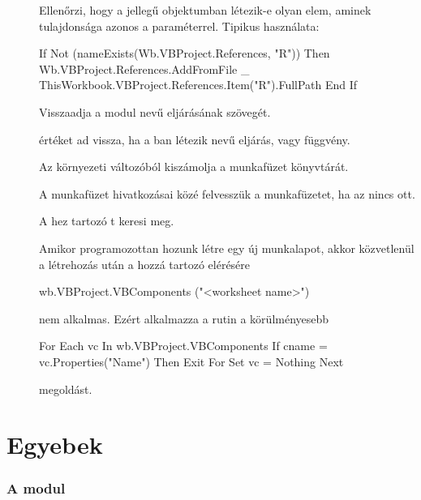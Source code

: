 \begin{description}
\item[] Ellenőrzi,
  hogy a 
   jellegű objektumban létezik-e
  olyan elem, aminek  tulajdonsága azonos a 
  paraméterrel. Tipikus használata: 
\begin{VBAframe}
If Not (nameExists(Wb.VBProject.References, "R")) Then
  Wb.VBProject.References.AddFromFile _
    ThisWorkbook.VBProject.References.Item("R").FullPath
End If
\end{VBAframe}
\item[]
  Visszaadja a  modul  nevű eljárásának szövegét.
\item[]
   értéket ad vissza, ha a 
  ban létezik  nevű eljárás, vagy függvény. 
\item[] Az  környezeti változóból kiszámolja
  a  munkafüzet könyvtárát. 
\item[] A  munkafüzet
  hivatkozásai közé felvesszük a  
  munkafüzetet, ha az nincs ott.
\item[] A 
  hez tartozó t keresi meg.

Amikor programozottan hozunk létre egy új munkalapot, akkor
közvetlenül a létrehozás után a hozzá tartozó  elérésére 
\begin{VBAframe}
wb.VBProject.VBComponents ("<worksheet name>")
\end{VBAframe}
nem alkalmas. Ezért alkalmazza a rutin a körülményesebb
\begin{VBAframe}
For Each vc In wb.VBProject.VBComponents
  If cname = vc.Properties("Name") Then Exit For
    Set vc = Nothing
Next
\end{VBAframe}
megoldást.
\end{description}

\section{Egyebek}\label{sec:6.6}

\subsubsection{A  modul}

